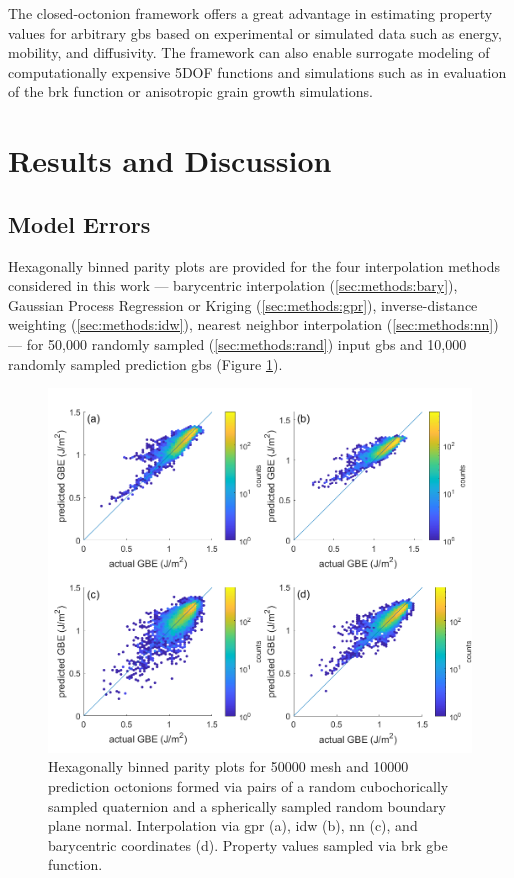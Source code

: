 \documentclass[preprint,12pt]{elsarticle}
\begin{document}
The closed-octonion framework offers a great advantage in estimating property values for arbitrary \glspl{gb} based on experimental or simulated data such as energy, mobility, and diffusivity. The framework can also enable surrogate modeling of computationally expensive 5DOF functions and simulations such as in evaluation of the \gls{brk} function or anisotropic grain growth simulations.

\section{Results and Discussion} \label{sec:results}

\subsection{Model Errors} \label{sec:results:mdlerror}

Hexagonally binned parity plots \cite{beanHexscatter2020} are provided for the four interpolation methods considered in this work --- barycentric interpolation (\ref{sec:methods:bary}), Gaussian Process Regression or Kriging (\ref{sec:methods:gpr}), inverse-distance weighting (\ref{sec:methods:idw}), nearest neighbor interpolation (\ref{sec:methods:nn}) --- for 50,000 randomly sampled (\ref{sec:methods:rand}) input \glspl{gb} and 10,000 randomly sampled prediction \glspl{gb} (Figure \ref{fig:brkparity50000}).
    
\begin{figure}
    \centering
    \includegraphics{brkparity50000.png}
    \caption{Hexagonally binned parity plots for 50000 mesh and 10000 prediction octonions formed via pairs of a random cubochorically sampled quaternion and a spherically sampled random boundary plane normal. Interpolation via \acrlong{gpr} (a), \acrlong{idw} (b), \acrlong{nn} (c), and barycentric coordinates (d). Property values sampled via \acrlong{brk} \acrlong{gbe} function.}
    \label{fig:brkparity50000}
\end{figure}
\end{document}
